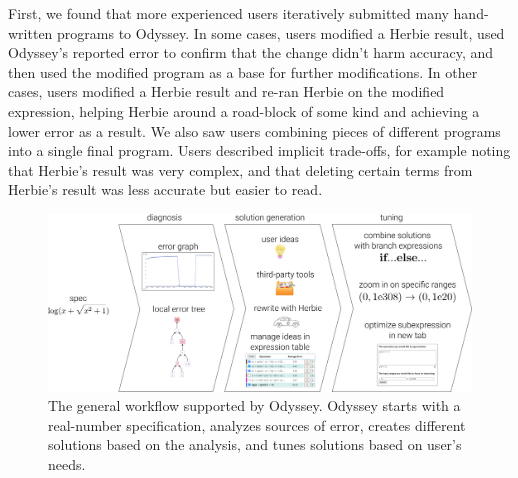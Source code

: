 
First, we found that more experienced users
  iteratively submitted many hand-written programs to Odyssey.
In some cases, users modified a Herbie result,
  used Odyssey's reported error to confirm
  that the change didn't harm accuracy,
  and then used the modified program
  as a base for further modifications.
In other cases, users modified a Herbie result
  and re-ran Herbie on the modified expression,
  helping Herbie around a road-block of some kind
  and achieving a lower error as a result.
We also saw users combining pieces of different programs
  into a single final program.
Users described implicit trade-offs,
  for example noting that Herbie's result was very complex,
  and that deleting certain terms from Herbie's result
  was less accurate but easier to read.


\begin{figure}
  \centering
  \includegraphics[width=\linewidth]{figures/workflow-diagram.png}
  \caption{The general workflow supported by Odyssey.
  Odyssey starts with a real-number specification,
    analyzes sources of error,
    creates different solutions based on the analysis,
    and tunes solutions based on user's needs.
  }%
  \label{fig:workflow}
\end{figure}

